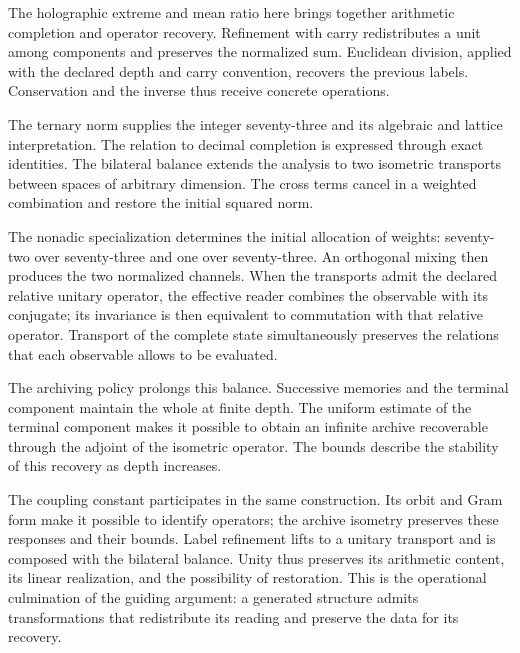 
The holographic extreme and mean ratio here brings together arithmetic
completion and operator recovery. Refinement with carry redistributes
a unit among components and preserves the normalized sum. Euclidean
division, applied with the declared depth and carry convention,
recovers the previous labels. Conservation and the inverse thus
receive concrete operations.

The ternary norm supplies the integer seventy-three and its algebraic
and lattice interpretation. The relation to decimal completion is
expressed through exact identities. The bilateral balance extends the
analysis to two isometric transports between spaces of arbitrary
dimension. The cross terms cancel in a weighted combination and
restore the initial squared norm.

The nonadic specialization determines the initial allocation of
weights: seventy-two over seventy-three and one over seventy-three.
An orthogonal mixing then produces the two normalized channels. When
the transports admit the declared relative unitary operator, the
effective reader combines the observable with its conjugate; its
invariance is then equivalent to commutation with that relative
operator. Transport of the complete state simultaneously preserves
the relations that each observable allows to be evaluated.

The archiving policy prolongs this balance. Successive memories and
the terminal component maintain the whole at finite depth. The
uniform estimate of the terminal component makes it possible to
obtain an infinite archive recoverable through the adjoint of the
isometric operator. The bounds describe the stability of this
recovery as depth increases.

The coupling constant participates in the same construction. Its
orbit and Gram form make it possible to identify operators; the
archive isometry preserves these responses and their bounds. Label
refinement lifts to a unitary transport and is composed with the
bilateral balance. Unity thus preserves its arithmetic content,
its linear realization, and the possibility of restoration. This is
the operational culmination of the guiding argument: a generated
structure admits transformations that redistribute its reading and
preserve the data for its recovery.

